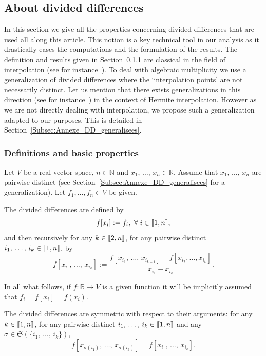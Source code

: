 \documentclass[AHL,Unicode,longabstracts]{cedram}
\newcommand{\llbracket}{\mathopen{[\mkern -2.7mu[}}
\newcommand{\rrbracket}{\mathclose{]\mkern -2.7mu]}}
\newcommand{\inter}[2]{\llbracket #1,#2 \rrbracket}
\newcommand{\N}{\mathbb{N}}
\newcommand{\R}{\mathbb{R}}
\let\oldforall\forall
\renewcommand*{\forall}{\mathrel{\oldforall}}
\begin{document}
\subsection{About divided differences} \label{Annexe_DD}


In this section we give all the properties concerning divided differences that are used all along this article. This notion is a key technical tool in our analysis as it drastically eases the computations and the formulation of the results. The definition and results given in Section~\ref{Subsec:Annexe_DD_classique} are classical in the field of interpolation (see for instance~\cite[Chapter 5]{Powell_1981}). To deal with algebraic multiplicity we use a generalization of divided differences where the `interpolation points' are not necessarily distinct. Let us mention that there exists generalizations in this direction (see for instance~\cite[Chapter 5]{Powell_1981}) in the context of Hermite interpolation. However as we are not directly dealing with interpolation, we propose such a generalization adapted to our purposes. This is detailed in Section~\ref{Subsec:Annexe_DD_generalisees}.

\subsubsection{Definitions and basic properties} \label{Subsec:Annexe_DD_classique}

Let $V$ be a real vector space, $n \in \N$ and $x_1,\,\dots,\,x_n \in \R$. Assume that $x_1,\,\dots,\,x_n$ are pairwise distinct (see Section~\ref{Subsec:Annexe_DD_generalisees} for a generalization). Let $f_1,\dotsc,f_n\in V$ be given.

\begin{defi} \label{Def:DifferencesDivisees}
The divided differences are defined by
\[
f[x_i]:=f_i,\ \forall i\in \inter{1}{n},
\]
and then recursively for any $k \in \inter{2}{n}$, for any pairwise distinct $i_1,\,\dots,\, i_k \in \inter{1}{n}$, by
\[
f[x_{i_1},\,\dots,\,x_{i_k}] := \frac{f[x_{i_1},\,\dots,\,x_{i_{k-1}}]-f[x_{i_2}, \dots, x_{i_k}]}{x_{i_1}-x_{i_k}}.
\]
\end{defi}
In all what follows, if $f : \R \to V$ is a given function it will be implicitly assumed that $f_i=f[x_i]=f(x_i)$.


\begin{prop}\label{Prop:DifferencesDiviseesSymetriques}
The divided differences are symmetric with respect to their arguments: for any $k \in \inter{1}{n}$, for any pairwise distinct $i_1,\,\dots,\,i_k \in \inter{1}{n}$ and any $\sigma \in \mathfrak{S}(\{i_1,\,\dotsc,\,i_k\})$,
\[
f[x_{\sigma(i_1)},\,\dots,\,x_{\sigma(i_k)}] = f[x_{i_1},\,\dots,\,x_{i_k}].
\]
\end{prop}
\end{document}

